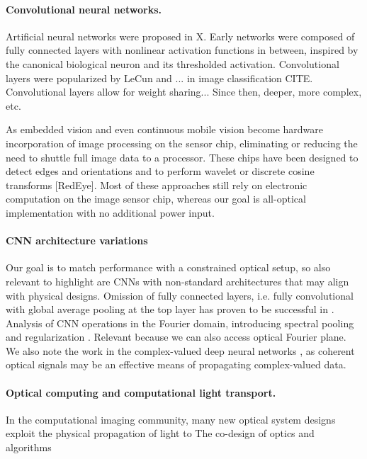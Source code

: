 \paragraph{Convolutional neural networks.} 
Artificial neural networks were proposed in X. Early networks were composed of fully connected layers with nonlinear activation functions in between, inspired by the canonical biological neuron and its thresholded activation. Convolutional layers were popularized by LeCun and ... in image classification CITE. Convolutional layers allow for weight sharing... Since then, deeper, more complex, etc. 

As embedded vision and even continuous mobile vision become 
hardware
incorporation of image processing on the sensor chip, eliminating or reducing the need to shuttle full image data to a processor. These chips have been designed to detect edges and orientations and to perform wavelet or discrete cosine transforms \cite{gruev2002implementation} [RedEye]. Most of these approaches still rely on electronic computation on the image sensor chip, whereas our goal is all-optical implementation with no additional power input. 

\paragraph{CNN architecture variations}

Our goal is to match performance with a constrained optical setup, so also relevant to highlight are CNNs with non-standard architectures that may align with physical designs. Omission of fully connected layers, i.e. fully convolutional with global average pooling at the top layer has proven to be successful in \cite{lin2013network,iandola2016squeezenet}. Analysis of CNN operations in the Fourier domain, introducing spectral pooling and regularization \cite{rippel2015spectral}. Relevant because we can also access optical Fourier plane. We also note the work in the complex-valued deep neural networks \cite{trabelsi2017deep}, as coherent optical signals may be an effective means of propagating complex-valued data.
 

\paragraph{Optical computing and computational light transport.}
In the computational imaging community, many new optical system designs exploit the physical propagation of light to 
The co-design of optics and algorithms 

